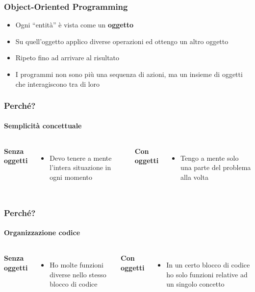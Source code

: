 \begin{contentframe}
    \frametitle{Object-Oriented Programming}

    \begin{itemize}
        \item Ogni ``entità'' è vista come un \textbf{oggetto}

        \bigskip
        \item Su quell'oggetto applico diverse operazioni ed ottengo un altro oggetto
        \item Ripeto fino ad arrivare al risultato

        \bigskip
        \item I programmi non sono più una sequenza di azioni, ma un insieme di oggetti che interagiscono tra di loro
    \end{itemize}
\end{contentframe}

\begin{contentframe}
    \frametitle{Perché?}
    \framesubtitle{Semplicità concettuale}

    \begin{columns}
        \textbf{Senza oggetti}
        \begin{itemize}
            \item Devo tenere a mente l'intera situazione in ogni momento
        \end{itemize}
        
        \textbf{Con oggetti}
        \begin{itemize}
            \item Tengo a mente solo una parte del problema alla volta
        \end{itemize}
    \end{columns}
\end{contentframe}

\begin{contentframe}
    \frametitle{Perché?}
    \framesubtitle{Organizzazione codice}

    \begin{columns}
        \textbf{Senza oggetti}
        \begin{itemize}
            \item Ho molte funzioni diverse nello stesso blocco di codice
        \end{itemize}
        
        \textbf{Con oggetti}
        \begin{itemize}
            \item In un certo blocco di codice ho solo funzioni relative ad un singolo concetto
        \end{itemize}
    \end{columns}
\end{contentframe}

